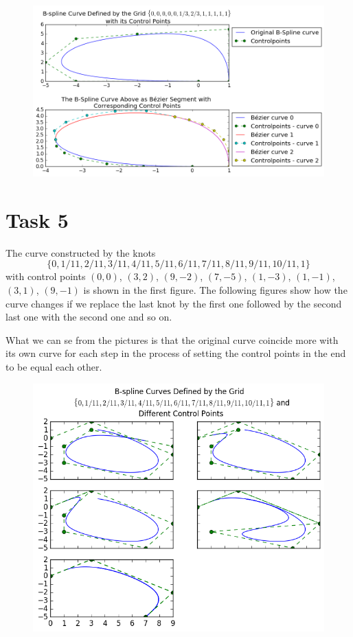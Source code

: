 \documentclass[]{article}
\begin{document}
\begin{figure}[h!]
	\includegraphics[scale=0.5]{task4}
\end{figure}

\newpage
\section*{Task 5}
The curve constructed by the knots $$\{0,1/11,2/11,3/11,4/11,5/11,6/11,7/11,8/11,9/11,10/11,1\}$$ with control points $(0,0)$, $(3,2)$, $(9,-2)$, $(7,-5)$, $(1,-3)$, $(1,-1)$, $(3,1)$, $(9,-1)$ is shown in the first figure. The following figures show how the curve changes if we replace the last knot by the first one followed by the second last one with the second one and so on. 

What we can se from the pictures is that the original curve coincide more with its own curve for each step in the process of setting the control points in the end to be equal each other. 

\begin{figure}[h!]
	\includegraphics[scale=0.7]{task5}
\end{figure}
\end{document}
